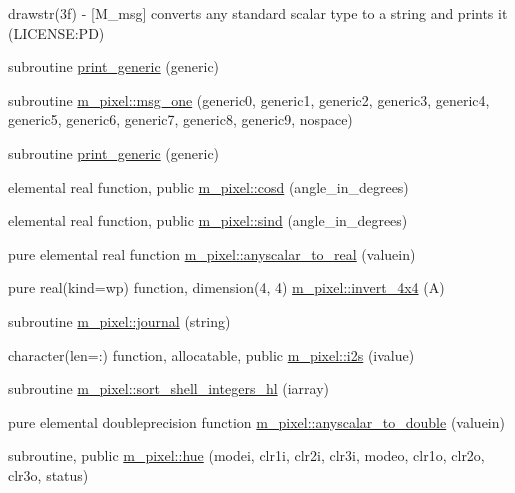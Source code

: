 \begin{DoxyCompactItemize}
\begin{DoxyCompactList}
drawstr(3f) -\/ \mbox{[}M\+\_\+msg\mbox{]} converts any standard scalar type to a string and prints it (L\+I\+C\+E\+N\+SE\+:PD) \end{DoxyCompactList}\item 
subroutine \mbox{\hyperlink{M__pixel_8f90_aaa8ee15f943d8e1543ae35ab732c3cd2}{print\+\_\+generic}} (generic)
\item 
subroutine \mbox{\hyperlink{namespacem__pixel_a8c097c521deafffc765bd3f35eca423c}{m\+\_\+pixel\+::msg\+\_\+one}} (generic0, generic1, generic2, generic3, generic4, generic5, generic6, generic7, generic8, generic9, nospace)
\item 
subroutine \mbox{\hyperlink{M__pixel_8f90_a9d5e1620d474ac03a74eeb9b0f7d6ae1}{print\+\_\+generic}} (generic)
\item 
elemental real function, public \mbox{\hyperlink{namespacem__pixel_a312c40bfbd03b2bbe6f85bc5efca6ce3}{m\+\_\+pixel\+::cosd}} (angle\+\_\+in\+\_\+degrees)
\item 
elemental real function, public \mbox{\hyperlink{namespacem__pixel_a3ef23ce0230c47b30cb627ebd439daae}{m\+\_\+pixel\+::sind}} (angle\+\_\+in\+\_\+degrees)
\item 
pure elemental real function \mbox{\hyperlink{namespacem__pixel_a79feab3c00d124d3f3396ad87ed4940e}{m\+\_\+pixel\+::anyscalar\+\_\+to\+\_\+real}} (valuein)
\item 
pure real(kind=wp) function, dimension(4, 4) \mbox{\hyperlink{namespacem__pixel_a630b892544962a88d91b1ab983dc5649}{m\+\_\+pixel\+::invert\+\_\+4x4}} (A)
\item 
subroutine \mbox{\hyperlink{namespacem__pixel_ac39c9efa849915aff58657e2df03fe3c}{m\+\_\+pixel\+::journal}} (string)
\item 
character(len=\+:) function, allocatable, public \mbox{\hyperlink{namespacem__pixel_a4d23e0d3f4de5b3652a4eb5a61d7dc8d}{m\+\_\+pixel\+::i2s}} (ivalue)
\item 
subroutine \mbox{\hyperlink{namespacem__pixel_a4396c3ff36a080fbbfa859348203d0c7}{m\+\_\+pixel\+::sort\+\_\+shell\+\_\+integers\+\_\+hl}} (iarray)
\item 
pure elemental doubleprecision function \mbox{\hyperlink{namespacem__pixel_a18d90bca3489d1280c4326e51b5cb7b3}{m\+\_\+pixel\+::anyscalar\+\_\+to\+\_\+double}} (valuein)
\item 
subroutine, public \mbox{\hyperlink{namespacem__pixel_aa76d2ac385f3ad0bc2b555cc14b7d53f}{m\+\_\+pixel\+::hue}} (modei, clr1i, clr2i, clr3i, modeo, clr1o, clr2o, clr3o, status)
\item 

\end{DoxyCompactItemize}
